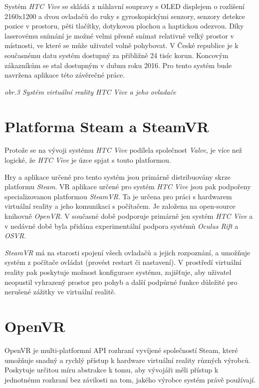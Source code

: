 Systém \emph{HTC Vive} se skládá z náhlavní soupravy s OLED displejem o
rozlišení 2160x1200 a dvou ovladačů do ruky s gyroskopickými senzory,
senzory detekce pozice v prostoru, pěti tlačítky, dotykovou plochou a
haptickou odezvou. \autocite{vivespec} Díky laserovému snímání je možné velmi přesně snímat
relativně velký prostor v místnosti, ve které se může uživatel volně
pohybovat. V České republice je k současnému datu systém dostupný za
přibližně 24 tisíc korun. \autocite{viveprice} Koncovým zákazníkům se stal dostupným v dubnu
roku 2016. Pro tento systém bude navržena aplikace této závěrečné práce.

\emph{obr.3 Systém virtuální reality HTC Vive a jeho ovladače}

\section{Platforma Steam a SteamVR}\label{platforma-steam-a-steamvr}

Protože se na vývoji systému \emph{HTC Vive} podílela společnost
\emph{Valve}, je více než logické, že \emph{HTC Vive} je úzce spjat s
touto platformou.

Hry a aplikace určené pro tento systém jsou primárně distribuovány skrze
platformu \emph{Steam}. VR aplikace určené pro systém \emph{HTC Vive}
jsou pak podpořeny specializovanou platformou \emph{SteamVR}. Ta je
určena pro práci s hardwarem virtuální reality a jeho komunikaci s
počítačem. Je založena na open-source knihovně \emph{OpenVR}. V současné
době podporuje primárně jen systém \emph{HTC Vive} a v nedávné době byla
přidána experimentální podpora systémů \emph{Oculus Rift} a \emph{OSVR}. \autocite{steamvrsupports}

\emph{SteamVR} má na starosti spojení všech ovladačů a jejich
rozpoznání, a umožňuje systém z počítače ovládat (provést restart či
nastavení). V prostředí virtuální reality pak poskytuje možnost
konfigurace systému, zajišťuje, aby uživatel neopustil vyhrazený prostor
pro pohyb a další podpůrné funkce důležité pro nerušené zážitky ve
virtuální realitě.

\section{OpenVR}\label{openvr}

OpenVR je multi-platformní API rozhraní vyvíjené společností Steam,
které umožňuje snadný a rychlý přístup k hardware virtuální reality
různých výrobců. Poskytuje určitou míru abstrakce k tomu, aby vývojáři
měli přístup k jednotnému rozhraní bez závilosti na tom, jakého výrobce
systém právě používají.
